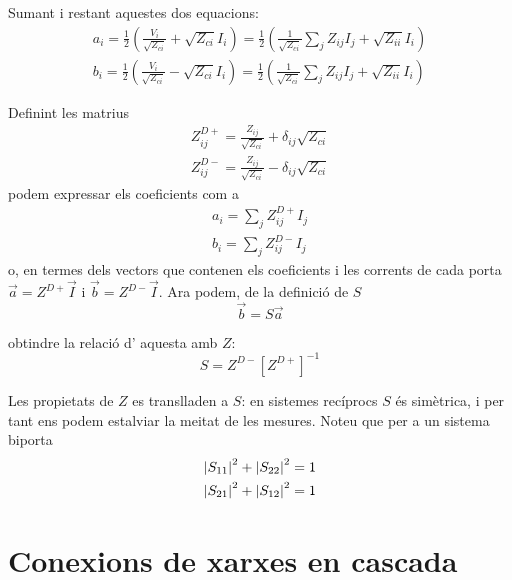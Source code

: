Sumant i restant aquestes dos equacions:
\begin{align}
  a_i = \frac{1}{2} \left ( \frac{V_i}{\sqrt{Z_{ci}}} + \sqrt{Z_{ci}} I_i \right ) = \frac{1}{2} \left ( \frac{1}{\sqrt{Z_{ci}}} \sum_j Z_{ij} I_j + \sqrt{Z_{ii}} I_i \right )  \\
  b_i = \frac{1}{2} \left ( \frac{V_i}{\sqrt{Z_{ci}}} - \sqrt{Z_{ci}} I_i \right ) = \frac{1}{2} \left ( \frac{1}{\sqrt{Z_{ci}}} \sum_j Z_{ij} I_j + \sqrt{Z_{ii}} I_i \right  )
\end{align}

Definint les matrius
\begin{align}
  Z_{ij} ^{D+} = \frac{Z_{ij}}{\sqrt{Z_{ci}}} + \delta _{ij} \sqrt{Z_{ci}} \\
  Z_{ij} ^{D-} = \frac{Z_{ij}}{\sqrt{Z_{ci}}} - \delta _{ij} \sqrt{Z_{ci}}
\end{align}
podem expressar els coeficients com a
\begin{align}
  a_i = \sum_j Z_{ij}^{D+} I_j \\
  b_i = \sum_j Z_{ij}^{D-} I_j
\end{align}
o, en termes dels vectors que contenen els coeficients i les corrents de cada porta $\vec a = Z^{D+} \vec I$ i $\vec b = Z^{D-} \vec I$.
Ara podem, de la definició de $S$
\begin{equation}
  \vec b = S \vec a
\end{equation}

obtindre la relació d' aquesta amb $Z$:
\begin{equation}
  S = Z^{D-} \left [ Z^{D+} \right ] ^{-1}
\end{equation}

Les propietats de $Z$ es translladen a $S$: en sistemes recíprocs $S$ és simètrica, i per tant ens podem estalviar la meitat de les mesures. Noteu que per a un sistema biporta
\begin{align}
  \left\rvert S_{11} \right\lvert ^2 +  \left\rvert S_{22} \right\lvert ^2 = 1 \\
  \left\rvert S_{21} \right\lvert ^2 +  \left\rvert S_{12} \right\lvert ^2 = 1 
\end{align}

\section{Conexions de xarxes en cascada}

